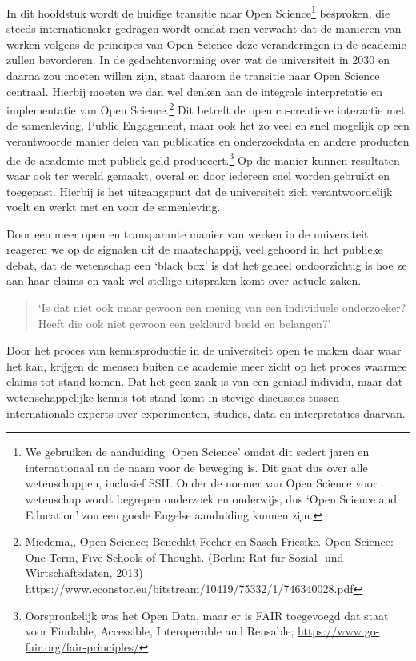 \documentclass{jote-book}
\begin{document}
	In dit hoofdstuk wordt de huidige transitie naar Open Science\footnote{We gebruiken de aanduiding ‘Open Science' omdat dit sedert jaren en internationaal nu de naam voor de beweging is. Dit gaat dus over alle wetenschappen, inclusief SSH. Onder de noemer van Open Science voor wetenschap wordt begrepen onderzoek en onderwijs, dus ‘Open Science and Education' zou een goede Engelse aanduiding kunnen zijn.} besproken, die steeds internationaler gedragen wordt omdat men verwacht dat de manieren van werken volgens de principes van Open Science deze veranderingen in de academie zullen bevorderen. In de gedachtenvorming over wat de universiteit in 2030 en daarna zou moeten willen zijn, staat daarom de transitie naar Open Science centraal. Hierbij moeten we dan wel denken aan de integrale interpretatie en implementatie van Open Science.\footnote{Miedema,, Open Science; Benedikt Fecher en Sasch Friesike. Open Science: One Term, Five Schools of Thought. (Berlin: Rat für Sozial- und Wirtschaftsdaten, 2013) https://www.econstor.eu/bitstream/10419/75332/1/746340028.pdf } Dit betreft de open co-creatieve interactie met de samenleving, Public Engagement, maar ook het zo veel en snel mogelijk op een verantwoorde manier delen van publicaties en onderzoekdata en andere producten die de academie met publiek geld produceert.\footnote{Oorspronkelijk was het Open Data, maar er is FAIR toegevoegd dat staat voor Findable, Accessible, Interoperable and Reusable; \href{https://www.go-fair.org/fair-principles/}{https://www.go-fair.org/fair-principles/}} Op die manier kunnen resultaten waar ook ter wereld gemaakt, overal en door iedereen snel worden gebruikt en toegepast. Hierbij is het uitgangspunt dat de universiteit zich verantwoordelijk voelt en werkt met en voor de samenleving.



	Door een meer open en transparante manier van werken in de universiteit reageren we op de signalen uit de maatschappij, veel gehoord in het publieke debat, dat de wetenschap een ‘black box' is dat het geheel ondoorzichtig is hoe ze aan haar claims en vaak wel stellige uitspraken komt over actuele zaken.

	\begin{quote}
		\itshape

		‘Is dat niet ook maar gewoon een mening van een individuele onderzoeker? Heeft die ook niet gewoon een gekleurd beeld en belangen?'
	\end{quote}

	Door het proces van kennisproductie in de universiteit open te maken daar waar het kan, krijgen de mensen buiten de academie meer zicht op het proces waarmee claims tot stand komen. Dat het geen zaak is van een geniaal individu, maar dat wetenschappelijke kennis tot stand komt in stevige discussies tussen internationale experts over experimenten, studies, data en interpretaties daarvan.
\end{document}
